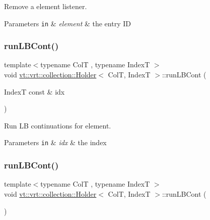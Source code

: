 Remove a element listener. 


\begin{DoxyParams}[1]{Parameters}
\mbox{\tt in}  & {\em element} & the entry ID \\
\hline
\end{DoxyParams}
\mbox{\label{structvt_1_1vrt_1_1collection_1_1_holder_a0e7fd8983ff18f85b7a2360b3732ef0a}} 
\subsubsection{\texorpdfstring{run\+L\+B\+Cont()}{runLBCont()}\hspace{0.1cm}{\footnotesize\ttfamily [1/2]}}
{\footnotesize\ttfamily template$<$typename ColT , typename IndexT $>$ \\
void \hyperlink{structvt_1_1vrt_1_1collection_1_1_holder}{vt\+::vrt\+::collection\+::\+Holder}$<$ ColT, IndexT $>$\+::run\+L\+B\+Cont (\begin{DoxyParamCaption}\item[{IndexT const \&}]{idx }\end{DoxyParamCaption})}



Run LB continuations for element. 


\begin{DoxyParams}[1]{Parameters}
\mbox{\tt in}  & {\em idx} & the index \\
\hline
\end{DoxyParams}
\mbox{\label{structvt_1_1vrt_1_1collection_1_1_holder_a4cb7b41d1bbdf4531e89ad56e24def97}} 
\subsubsection{\texorpdfstring{run\+L\+B\+Cont()}{runLBCont()}\hspace{0.1cm}{\footnotesize\ttfamily [2/2]}}
{\footnotesize\ttfamily template$<$typename ColT , typename IndexT $>$ \\
void \hyperlink{structvt_1_1vrt_1_1collection_1_1_holder}{vt\+::vrt\+::collection\+::\+Holder}$<$ ColT, IndexT $>$\+::run\+L\+B\+Cont (\begin{DoxyParamCaption}{ }\end{DoxyParamCaption})}



